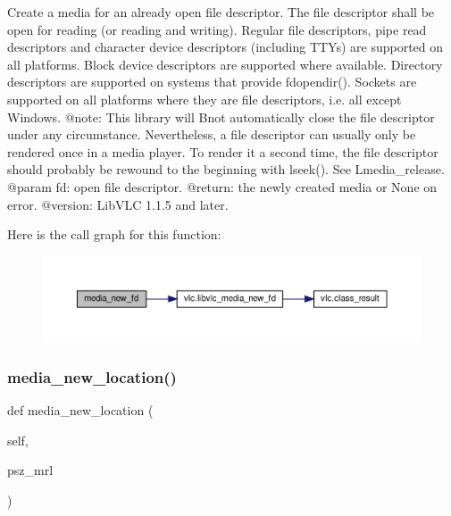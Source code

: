 \begin{DoxyVerb}Create a media for an already open file descriptor.
The file descriptor shall be open for reading (or reading and writing).
Regular file descriptors, pipe read descriptors and character device
descriptors (including TTYs) are supported on all platforms.
Block device descriptors are supported where available.
Directory descriptors are supported on systems that provide fdopendir().
Sockets are supported on all platforms where they are file descriptors,
i.e. all except Windows.
@note: This library will B{not} automatically close the file descriptor
under any circumstance. Nevertheless, a file descriptor can usually only be
rendered once in a media player. To render it a second time, the file
descriptor should probably be rewound to the beginning with lseek().
See L{media_release}.
@param fd: open file descriptor.
@return: the newly created media or None on error.
@version: LibVLC 1.1.5 and later.
\end{DoxyVerb}
 Here is the call graph for this function\+:
\nopagebreak
\begin{figure}[H]
\begin{center}
\leavevmode
\includegraphics[width=350pt]{classvlc_1_1_instance_a60fb4f1457712151b617bdb9923e2fb4_cgraph}
\end{center}
\end{figure}
\mbox{\label{classvlc_1_1_instance_a1bcce3da08d8de8c46af611da2bf37fa}} 
\subsubsection{\texorpdfstring{media\+\_\+new\+\_\+location()}{media\_new\_location()}}
{\footnotesize\ttfamily def media\+\_\+new\+\_\+location (\begin{DoxyParamCaption}\item[{}]{self,  }\item[{}]{psz\+\_\+mrl }\end{DoxyParamCaption})}


